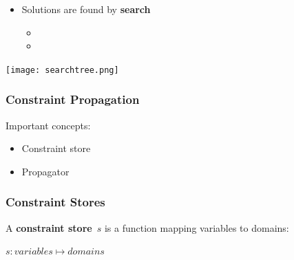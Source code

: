 \documentclass{beamer}
\begin{document}
\begin{frame}
  \begin{minipage}{0.6\textwidth}
    \begin{itemize}
    \item Solutions are found by \textbf{search}
      \begin{itemize}
      \item {}
      \item {}
      \end{itemize}
    \end{itemize}
  \end{minipage}
  \begin{minipage}{0.15\textwidth}
    \texttt{[image: searchtree.png]}
  \end{minipage}
  
\end{frame}



\begin{frame}
  \frametitle{Constraint Propagation}
  Important concepts:
  \begin{itemize}
    \item Constraint store
    \item Propagator
  \end{itemize}
\end{frame}

\begin{frame}
  \frametitle{Constraint Stores}
  \begin{definition}
    A \textbf{constraint store}~$s$ is a function mapping variables
    to domains:
    \begin{center}
      $s: variables \mapsto domains$
    \end{center}
  \end{definition}


\end{frame}
\end{document}
